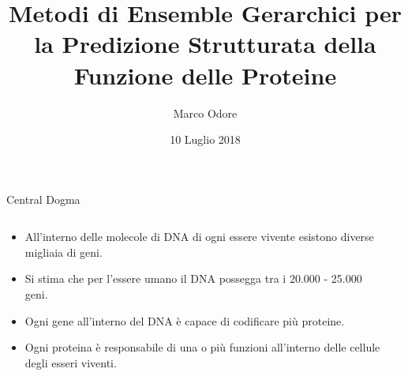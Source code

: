 \documentclass{beamer}
\author{Marco Odore}
\title[Metodi di Ensemble Gerarchici]{Metodi di Ensemble Gerarchici per la Predizione Strutturata della Funzione delle Proteine}
\date{10 Luglio 2018}
\begin{document}
\titlepageframe
\begin{tframe}{Central Dogma}
  \begin{columns}
    \begin{column}{.65\textwidth}
      \minipage[c][0.4\textheight][s]{\columnwidth}
	   \begin{itemize}	
	  \item All'interno delle molecole di DNA di ogni essere vivente esistono diverse migliaia di geni.   
	  \item Si stima che per l'essere umano il DNA possegga tra i 20.000 - 25.000 geni.
      \item Ogni gene all'interno del DNA è capace di codificare più proteine.	
      \item Ogni proteina è responsabile di una o più funzioni all'interno delle cellule degli esseri viventi.
      \end{itemize}
      \endminipage      
    \end{column}
    \begin{column}{.35\textwidth}



    \end{column}
  \end{columns}

\end{tframe}
\end{document}
